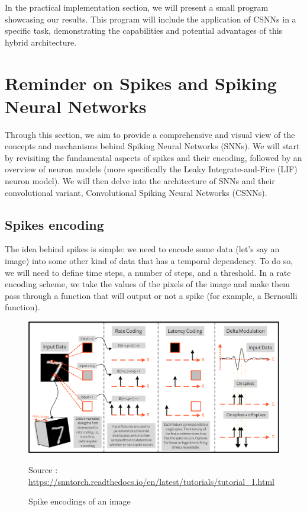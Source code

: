 \documentclass[11pt]{article}
\begin{document}
In the practical implementation section, we will present a small program showcasing our results. This program will include the application of CSNNs in a specific task, demonstrating the capabilities and potential advantages of this hybrid architecture.


\pagebreak

\section{Reminder on Spikes and Spiking Neural Networks}

Through this section, we aim to provide a comprehensive and visual view of the concepts and mechanisms behind Spiking Neural Networks (SNNs). We will start by revisiting the fundamental aspects of spikes and their encoding, followed by an overview of neuron models (more specifically the Leaky Integrate-and-Fire (LIF) neuron model). We will then delve into the architecture of SNNs and their convolutional variant, Convolutional Spiking Neural Networks (CSNNs).

\subsection{Spikes encoding}

The idea behind spikes is simple: we need to encode some data (let's say an image) into some other kind of data that has a temporal dependency. To do so, we will need to define time steps, a number of steps, and a threshold.
In a rate encoding scheme, we take the values of the pixels of the image and make them pass through a function that will output or not a spike (for example, a Bernoulli function).


\begin{figure}[ht]
  \centering
  \includegraphics[width=\textwidth]{./image/spikeconv.png}
  \caption{Spike encodings of an image \cite{eshraghian2021training}}
  Source : \url{https://snntorch.readthedocs.io/en/latest/tutorials/tutorial_1.html}
  \label{fig:spikeconversion}
\end{figure}
\end{document}
